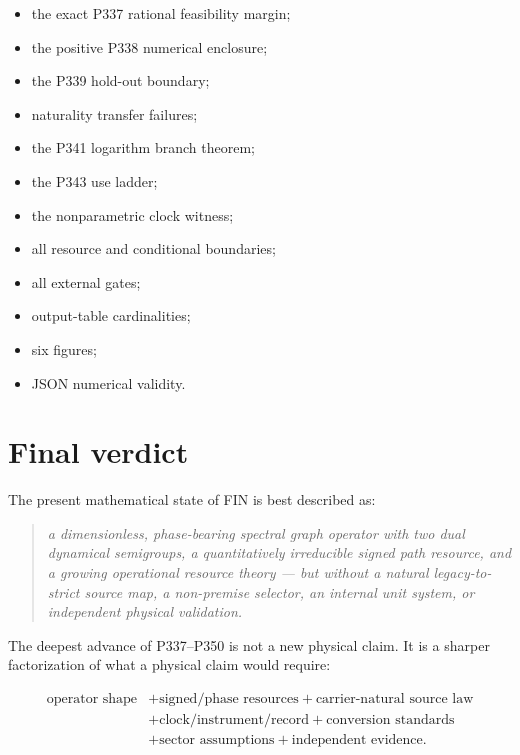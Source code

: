 \documentclass[11pt,a4paper,openany]{report}
\begin{document}
\begin{itemize}
\item 
the exact P337 rational feasibility margin;

\item 
the positive P338 numerical enclosure;

\item 
the P339 hold-out boundary;

\item 
naturality transfer failures;

\item 
the P341 logarithm branch theorem;

\item 
the P343 use ladder;

\item 
the nonparametric clock witness;

\item 
all resource and conditional boundaries;

\item 
all external gates;

\item 
output-table cardinalities;

\item 
six figures;

\item 
JSON numerical validity.

\end{itemize}

\chapter{Final verdict}

The present mathematical state of FIN is best described as:

\begin{quote}\itshape
a dimensionless, phase-bearing spectral graph operator with two dual dynamical semigroups, a quantitatively irreducible signed path resource, and a growing operational resource theory --- but without a natural legacy-to-strict source map, a non-premise selector, an internal unit system, or independent physical validation.

\end{quote}

The deepest advance of P337--P350 is not a new physical claim. It is a sharper factorization of what a physical claim would require:

\[
\begin{aligned}
\text{operator shape}
&+\text{signed/phase resources}
+\text{carrier-natural source law}
\\
&+\text{clock/instrument/record}
+\text{conversion standards}
\\
&+\text{sector assumptions}
+\text{independent evidence}.
\end{aligned}
\]
\end{document}
